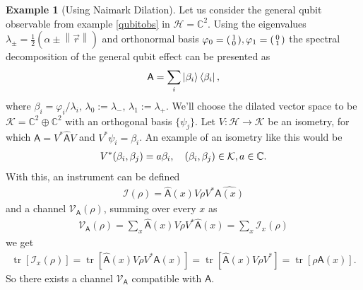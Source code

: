 \documentclass[a4paper,12pt]{wihuri}
\theoremstyle{definition}
\newtheorem{example}{Example}
\numberwithin{definition}{section}
\numberwithin{example}{section}
\numberwithin{theorem}{section}
\numberwithin{proposition}{section}
\numberwithin{lemma}{section}
\newcommand{\I}{\mathcal{I}}%
\newcommand{\hi}{\mathcal{H}}%
\newcommand{\ki}{\mathcal{K}}%
\newcommand{\V}{\mathcal{V}}%
\newcommand{\A}{\mathsf{A}}%
\newcommand{\cc}{\mathbb{C}^2}%
\DeclareMathOperator{\tr}{tr}
\newcommand{\norm}[1]{\left\lVert#1\right\rVert}
\newenvironment{psmallmatrix}
  {\left(\begin{smallmatrix}}
  {\end{smallmatrix}\right)}
\begin{document}
\begin{example}[Using Naimark Dilation]%
Let us consider the general qubit observable from example \ref{qubitobs} in $\hi = \cc$. Using the eigenvalues $\lambda_\pm = \frac{1}{2}(\alpha \pm \norm{\vec{r}})$ and orthonormal basis $\varphi_0 = \begin{psmallmatrix}
1 \\
0
\end{psmallmatrix} , \varphi_1 = \begin{psmallmatrix}
0 \\
1
\end{psmallmatrix}$
the spectral decomposition of the general qubit effect can be presented as 
\begin{align*}
\A = \sum_i \ket{\beta_i}\bra{\beta_i},
\end{align*}
where $\beta_i = \varphi_i / \lambda_i,\, \lambda_0 :=\lambda_{-},\, \lambda_1 := \lambda_{+}$. We'll choose the dilated vector space to be $\ki =\cc \oplus \cc$ with an orthogonal basis $\lbrace\psi_j\rbrace$. Let $V: \hi \rightarrow \ki$ be an isometry, for which $\A = V^*\hat{\A}V$ and $V^*\psi_i = \beta_i$. An example of an isometry like this would be
\begin{align*}
V^*(\beta_i, \beta_j) = a\beta_i,\quad (\beta_i, \beta_j) \in \ki, a \in \mathbb{C}\text.
\end{align*}
With this, an instrument can be defined
\begin{align*}
\I(\rho) = \hat{\A}(x)V\rho V^*\hat{\A(x)}
\end{align*}
and a channel $\V_\A(\rho)$, summing over every $x$ as 
\begin{align*}
\V_\A(\rho) = \sum_x \hat{\A}(x) V\rho V^*\hat{\A}(x) = \sum_x \I_x(\rho)
\end{align*}
we get
\begin{align*}
\tr[\I_x(\rho)] = \tr[\hat{\A}(x) V \rho V^* \hat{\A}(x)] = \tr[\hat{\A}(x) V \rho V^*] = \tr[\rho \A(x)]\text{.}
\end{align*}
So there exists a channel $\V_\A$ compatible with $\A$.
\end{example}




\end{document}
